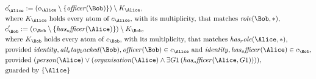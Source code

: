 \begin{align*}
&
c'_
{
\Alice
}
 := 
(c_
{
\Alice
}
 \setminus 
\{
\mathit{
officer
}
(
\Bob
)
\}
) \setminus K_
{
\Alice
}
,\\
&
\text{where } K_
{
\Alice
}
 \text{ holds every atom of } c_
{
\Alice
}
 \text{, with its multiplicity, that matches } 
\mathit{
role
}
(
\Bob
,
\ast
)
,\\
&
c'_
{
\Bob
}
 := 
(c_
{
\Bob
}
 \setminus 
\{
\mathit{
has_officer
}
(
\Alice
)
\}
) \setminus K_
{
\Bob
}
,\\
&
\text{where } K_
{
\Bob
}
 \text{ holds every atom of } c_
{
\Bob
}
 \text{, with its multiplicity, that matches } 
\mathit{
has_role
}
(
\Alice
,
\ast
)
,\\
&
\text{provided } 
\mathit{
identity
}
,
\mathit{
all_stay_backed
}
(
\Bob
)
,
\mathit{
officer
}
(
\Bob
)
 \in c_
{
\Alice
}
 \text{ and } 
\mathit{
identity
}
,
\mathit{
has_officer
}
(
\Alice
)
 \in c_
{
\Bob
}
,\\
&
\text{provided } 
(
\mathit{
person
}
(
\Alice
)
\lor
(
\mathit{
organisation
}
(
\Alice
)
\land
\exists 
G1
\,(
\mathit{
has_officer
}
(
\Alice
,
G1
)
)
)
)
,\\
&
\text{guarded by } \{
\Alice
\}
\end{align*}

